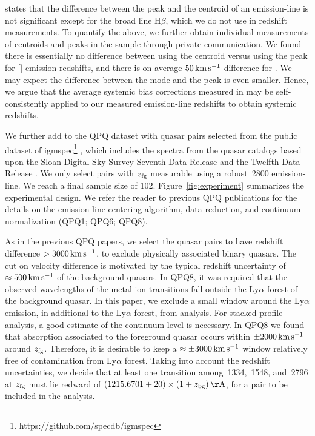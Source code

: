 \documentclass[iop]{emulateapj}
\begin{document}
states that the difference between the peak and the centroid of an emission-line
is not significant except for the broad line H$\beta$, which we do not use in redshift
measurements. To quantify the above, we further obtain individual measurements of centroids and
peaks in the \cite{Shen+16} sample through private communication. We found there is essentially no
difference between using the centroid versus using the peak for [] emission redshifts,
and there is on average $50\,{\rm km\,s^{-1}}$ difference for . We may expect the
difference between the mode and the peak is even smaller. Hence, we argue that the average
systemic bias corrections measured in \cite{Shen+16} may be self-consistently applied to our
measured emission-line redshifts to obtain systemic redshifts.

We further add to the QPQ dataset with quasar pairs selected from the public dataset of 
igmspec\footnote{https://github.com/specdb/igmspec} \citep{Prochaska+17}, which includes the 
spectra from the quasar catalogs based upon the Sloan Digital Sky Survey Seventh Data Release 
\citep{Schneider+10} and the Twelfth Data Release \citep{Paris+17}. We only select pairs with 
$z_{\rm fg}$ measurable using a robust \,2800 emission-line. 
We reach a final sample size of 102. 
Figure~\ref{fig:experiment} summarizes the experimental design. We refer the reader to previous 
QPQ publications for the details on the emission-line centering algorithm, data reduction, and
continuum normalization (QPQ1; QPQ6; QPQ8).

As in the previous QPQ papers, we select the quasar pairs to have redshift difference 
$>3000\,{\rm km\,s^{-1}}$, to exclude physically associated binary quasars. The cut on velocity 
difference is motivated by the typical redshift uncertainty of $\approx500\,{\rm km\,s^{-1}}$ of 
the background quasars. In QPQ8, it was required that the observed wavelengths of the 
metal ion transitions fall outside the Ly$\alpha$ forest of the background quasar. In this paper, 
we exclude a small window around the Ly$\alpha$ emission, in additional to the Ly$\alpha$ forest, 
from analysis. For stacked profile analysis, a good estimate of 
the continuum level is necessary. In QPQ8 we found that absorption associated to 
the foreground quasar occurs within $\pm2000\,{\rm km\,s^{-1}}$ around $z_{\rm fg}$. Therefore, it 
is desirable to keep a $\approx\pm3000\,{\rm km\,s^{-1}}$ window relatively free of contamination 
from Ly$\alpha$ forest. Taking into account the redshift uncertainties, 
we decide that at least one transition among \,1334, \,1548, and 
\,2796 at $z_{\rm fg}$ must lie redward of 
$(1215.6701+20)\times(1+z_{\rm bg})\,{\rm \AA}$, for a pair to be included in the analysis. 
\end{document}
